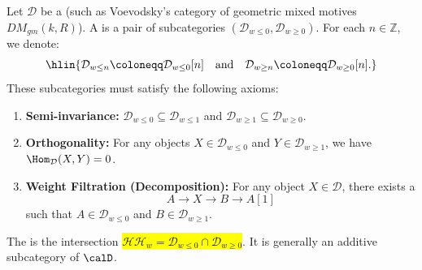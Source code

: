 \begin{definition} \label{definition:weight_structure_on_a_triangulated_category} 
Let $\mathcal{D}$ be a  (such as Voevodsky's category of geometric mixed motives $DM_{gm}(k, R)$). A  is a pair of  subcategories $(\mathcal{D}_{w \leq 0}, \mathcal{D}_{w \geq 0})$. For each $n \in \mathbb{Z}$, we denote:
$$\hlin{\mathcal{D}_{w \leq n} \coloneqq \mathcal{D}_{w \leq 0}[n] \quad \text{and} \quad \mathcal{D}_{w \geq n} \coloneqq \mathcal{D}_{w \geq 0}[n].}$$
These subcategories must satisfy the following axioms:
\begin{enumerate} 
    \item \textbf{Semi-invariance:} $\mathcal{D}_{w \leq 0} \subseteq \mathcal{D}_{w \leq 1}$ and $\mathcal{D}_{w \geq 1} \subseteq \mathcal{D}_{w \geq 0}$.
    \item \textbf{Orthogonality:} For any objects $X \in \mathcal{D}_{w \leq 0}$ and $Y \in \mathcal{D}_{w \geq 1}$, we have $\Hom_{\mathcal{D}}(X, Y) = 0$. 
    \item \textbf{Weight Filtration (Decomposition):} For any object $X \in \mathcal{D}$, there exists a  
    \[ A \to X \to B \to A[1] \] 
    such that $A \in \mathcal{D}_{w \leq 0}$ and $B \in \mathcal{D}_{w \geq 1}$. 
\end{enumerate} 
The  is the intersection \hl{$\mathcal{H} \mathcal{H}_w = \mathcal{D}_{w \leq 0} \cap \mathcal{D}_{w \geq 0}$}. It is generally an additive subcategory of $\calD$. 
\end{definition}